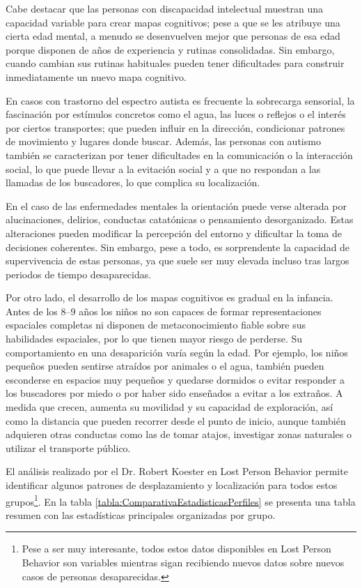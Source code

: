     Cabe destacar que las personas con discapacidad intelectual muestran una capacidad variable para crear mapas cognitivos; pese a que se les atribuye una cierta edad mental, a menudo se desenvuelven mejor que personas de esa edad porque disponen de años de experiencia y rutinas consolidadas. Sin embargo, cuando cambian sus rutinas habituales pueden tener dificultades para construir inmediatamente un nuevo mapa cognitivo.
    
    En casos con trastorno del espectro autista es frecuente la sobrecarga sensorial, la fascinación por estímulos concretos como el agua, las luces o reflejos o el interés por ciertos transportes; que pueden influir en la dirección, condicionar patrones de movimiento y lugares donde buscar. Además, las personas con autismo también se caracterizan por tener dificultades en la comunicación o la interacción social, lo que puede llevar a la evitación social y a que no respondan a las llamadas de los buscadores, lo que complica su localización.
        
    En el caso de las enfermedades mentales la orientación puede verse alterada por alucinaciones, delirios, conductas catatónicas o pensamiento desorganizado. Estas alteraciones pueden modificar la percepción del entorno y dificultar la toma de decisiones coherentes. Sin embargo, pese a todo, es sorprendente la capacidad de supervivencia de estas personas, ya que suele ser muy elevada incluso tras largos periodos de tiempo desaparecidas.
    
    Por otro lado, el desarrollo de los mapas cognitivos es gradual en la infancia. Antes de los 8–9 años los niños no son capaces de formar representaciones espaciales completas ni disponen de metaconocimiento fiable sobre sus habilidades espaciales, por lo que tienen mayor riesgo de perderse. Su comportamiento en una desaparición varía según la edad. Por ejemplo, los niños pequeños pueden sentirse atraídos por animales o el agua, también pueden esconderse en espacios muy pequeños y quedarse dormidos o evitar responder a los buscadores por miedo o por haber sido enseñados a evitar a los extraños. A medida que crecen, aumenta su movilidad y su capacidad de exploración, así como la distancia que pueden recorrer desde el punto de inicio, aunque también adquieren otras conductas como las de tomar atajos, investigar zonas naturales o utilizar el transporte público.
    
    El análisis realizado por el Dr. Robert Koester en Lost Person Behavior\cite{libroLostPersonBehavior} permite identificar algunos patrones de desplazamiento y localización para todos estos grupos\footnote{Pese a ser muy interesante, todos estos datos disponibles en Lost Person Behavior son variables mientras sigan recibiendo nuevos datos sobre nuevos casos de personas desaparecidas.}. En la tabla \ref{tabla:ComparativaEstadisticasPerfiles} se presenta una tabla resumen con las estadísticas principales organizadas por grupo.
    
